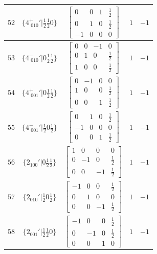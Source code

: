\documentclass[fleqn,8pt]{jsarticle}
\begin{document}
\begin{longtable}{ccccc}
$ 52 $ & $ \{4^{+}_{\,\,010}{}'|\frac{1}{2} \frac{1}{2} 0\} $ & $ \begin{bmatrix} 0 & 0 & 1 & \frac{1}{2} \\ 0 & 1 & 0 & \frac{1}{2} \\ -1 & 0 & 0 & 0 \end{bmatrix} $ & $ 1 $ & $ -1 $ \\ \hline
$ 53 $ & $ \{4^{-}_{\,\,010}{}'|0 \frac{1}{2} \frac{1}{2}\} $ & $ \begin{bmatrix} 0 & 0 & -1 & 0 \\ 0 & 1 & 0 & \frac{1}{2} \\ 1 & 0 & 0 & \frac{1}{2} \end{bmatrix} $ & $ 1 $ & $ -1 $ \\ \hline
$ 54 $ & $ \{4^{+}_{\,\,001}{}'|0 \frac{1}{2} \frac{1}{2}\} $ & $ \begin{bmatrix} 0 & -1 & 0 & 0 \\ 1 & 0 & 0 & \frac{1}{2} \\ 0 & 0 & 1 & \frac{1}{2} \end{bmatrix} $ & $ 1 $ & $ -1 $ \\ \hline
$ 55 $ & $ \{4^{-}_{\,\,001}{}'|\frac{1}{2} 0 \frac{1}{2}\} $ & $ \begin{bmatrix} 0 & 1 & 0 & \frac{1}{2} \\ -1 & 0 & 0 & 0 \\ 0 & 0 & 1 & \frac{1}{2} \end{bmatrix} $ & $ 1 $ & $ -1 $ \\ \hline
$ 56 $ & $ \{2{}_{100}{}'|0 \frac{1}{2} \frac{1}{2}\} $ & $ \begin{bmatrix} 1 & 0 & 0 & 0 \\ 0 & -1 & 0 & \frac{1}{2} \\ 0 & 0 & -1 & \frac{1}{2} \end{bmatrix} $ & $ 1 $ & $ -1 $ \\ \hline
$ 57 $ & $ \{2{}_{010}{}'|\frac{1}{2} 0 \frac{1}{2}\} $ & $ \begin{bmatrix} -1 & 0 & 0 & \frac{1}{2} \\ 0 & 1 & 0 & 0 \\ 0 & 0 & -1 & \frac{1}{2} \end{bmatrix} $ & $ 1 $ & $ -1 $ \\ \hline
$ 58 $ & $ \{2{}_{001}{}'|\frac{1}{2} \frac{1}{2} 0\} $ & $ \begin{bmatrix} -1 & 0 & 0 & \frac{1}{2} \\ 0 & -1 & 0 & \frac{1}{2} \\ 0 & 0 & 1 & 0 \end{bmatrix} $ & $ 1 $ & $ -1 $ \\ \hline

\end{longtable}
\end{document}

